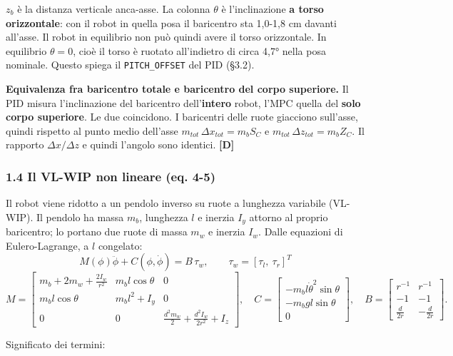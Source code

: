 \documentclass[
]{article}
\begin{document}
\(z_b\) è la distanza verticale anca-asse. La colonna \(\theta\) è l'inclinazione \textbf{a torso orizzontale}: con il robot in quella posa il baricentro sta 1,0-1,8 cm davanti all'asse. Il robot in equilibrio non può quindi avere il torso orizzontale. In equilibrio \(\theta = 0\), cioè il torso è ruotato all'indietro di circa 4,7° nella posa nominale. Questo spiega il \texttt{PITCH\_OFFSET} del PID (§3.2).

\textbf{Equivalenza fra baricentro totale e baricentro del corpo superiore.} Il PID misura l'inclinazione del baricentro dell'\textbf{intero} robot, l'MPC quella del \textbf{solo corpo superiore}. Le due coincidono. I baricentri delle ruote giacciono sull'asse, quindi rispetto al punto medio dell'asse \(m_{tot}\,\Delta x_{tot} = m_b S_C\) e \(m_{tot}\,\Delta z_{tot} = m_b Z_C\). Il rapporto \(\Delta x/\Delta z\) e quindi l'angolo sono identici. \textbf{[D]}

\subsubsection{1.4 Il VL-WIP non lineare (eq. 4-5)}\label{14-il-vl-wip-non-lineare-eq-4-5}

Il robot viene ridotto a un pendolo inverso su ruote a lunghezza variabile (VL-WIP). Il pendolo ha massa \(m_b\), lunghezza \(l\) e inerzia \(I_y\) attorno al proprio baricentro; lo portano due ruote di massa \(m_w\) e inerzia \(I_w\). Dalle equazioni di Eulero-Lagrange, a \(l\) congelato: \[M(\phi)\ddot\phi + C(\phi,\dot\phi) = B\,\tau_w, \qquad \tau_w = [\tau_l,\ \tau_r]^T\] \[M = \begin{bmatrix} m_b+2m_w+\frac{2I_w}{r^2} & m_b l\cos\theta & 0\\ m_b l\cos\theta & m_b l^2 + I_y & 0 \\ 0 & 0 & \frac{d^2 m_w}{2}+\frac{d^2 I_w}{2r^2}+I_z\end{bmatrix},\quad C = \begin{bmatrix} -m_b l\dot\theta^2\sin\theta \\ -m_b g l \sin\theta \\ 0\end{bmatrix},\quad B = \begin{bmatrix} r^{-1} & r^{-1}\\ -1 & -1 \\ \frac{d}{2r} & -\frac{d}{2r}\end{bmatrix}.\]

Significato dei termini:
\end{document}
